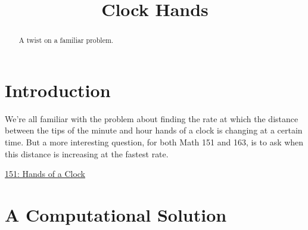 \documentclass{ximera}
\title{Clock Hands}
\begin{document}
\begin{abstract}
A twist on a familiar problem.
\end{abstract}
\maketitle

\section*{Introduction}
We're all familiar with the problem about finding the rate at which the distance between the tips of the minute and hour hands of a clock is changing at a certain time. But a more interesting question, for both Math 151 and 163, is to ask when this distance is increasing at the fastest rate. 


\begin{onlineOnly}
    \begin{center}
\end{center}
\end{onlineOnly}

\href{https://www.desmos.com/calculator/qvk0mzy26u}{151: Hands of a Clock}


\section*{A Computational Solution}
\end{document}
